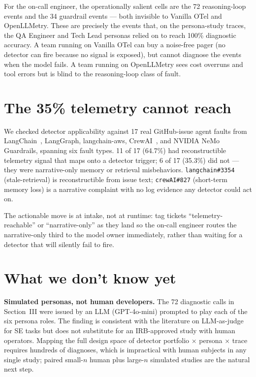 \documentclass[journal]{IEEEtran}
\begin{document}
For the on-call engineer, the operationally salient cells are the 72 reasoning-loop events and the 34 guardrail events --- both invisible to Vanilla OTel and OpenLLMetry. These are precisely the events that, on the persona-study traces, the QA Engineer and Tech Lead personas relied on to reach 100\% diagnostic accuracy. A team running on Vanilla OTel can buy a noise-free pager (no detector can fire because no signal is exposed), but cannot diagnose the events when the model fails. A team running on OpenLLMetry sees cost overruns and tool errors but is blind to the reasoning-loop class of fault.

\section{The 35\% telemetry cannot reach}

We checked detector applicability against 17 real GitHub-issue agent faults from LangChain~\cite{langchain}, LangGraph, langchain-aws, CrewAI~\cite{crewai}, and NVIDIA NeMo Guardrails, spanning six fault types. 11 of 17 (64.7\%) had reconstructible telemetry signal that maps onto a detector trigger; 6 of 17 (35.3\%) did not --- they were narrative-only memory or retrieval misbehaviors. \texttt{langchain\#3354} (stale-retrieval) is reconstructible from issue text; \texttt{crewAI\#827} (short-term memory loss) is a narrative complaint with no log evidence any detector could act on.

The actionable move is at intake, not at runtime: tag tickets ``telemetry-reachable'' or ``narrative-only'' as they land so the on-call engineer routes the narrative-only third to the model owner immediately, rather than waiting for a detector that will silently fail to fire.

\section{What we don't know yet}

\textbf{Simulated personas, not human developers.} The 72 diagnostic calls in Section~III were issued by an LLM (GPT-4o-mini) prompted to play each of the six persona roles. The finding is consistent with the literature on LLM-as-judge for SE tasks but does not substitute for an IRB-approved study with human operators. Mapping the full design space of detector portfolio $\times$ persona $\times$ trace requires hundreds of diagnoses, which is impractical with human subjects in any single study; paired small-$n$ human plus large-$n$ simulated studies are the natural next step.
\end{document}
